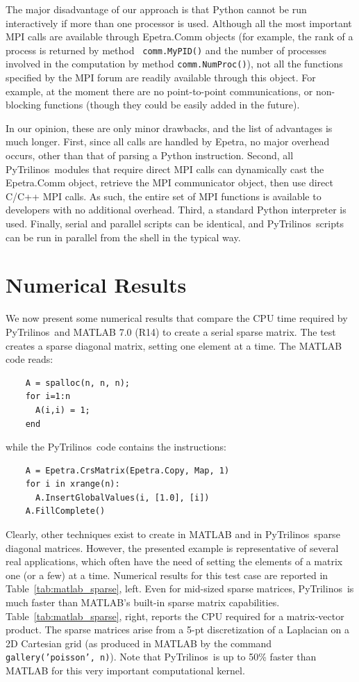 \documentclass{llncs}
\newcommand{\PyTrilinos}{{\sc PyTrilinos}}
\begin{document}
The major disadvantage of our approach is that Python cannot be run
interactively if more than one processor is used.  Although all the
most important MPI calls are available through Epetra.Comm objects
(for example, the rank of a process is returned by method {\tt
  comm.MyPID()} and the number of processes involved in the
computation by method {\tt comm.NumProc()}), not all the functions
specified by the MPI forum are readily available through this object.
For example, at the moment there are no point-to-point communications,
or non-blocking functions (though they could be easily added in the
future).

In our opinion, these are only minor drawbacks, and the list of
advantages is much longer.  First, since all calls are handled by
Epetra, no major overhead occurs, other than that of parsing a Python
instruction.  Second, all \PyTrilinos\ modules that require direct MPI
calls can dynamically cast the Epetra.Comm object, retrieve the MPI
communicator object, then use direct C/C++ MPI calls.  As such, the
entire set of MPI functions is available to developers with no
additional overhead.  Third, a standard Python interpreter is used.
Finally, serial and parallel scripts can be identical, and \PyTrilinos{}ripts can be run in parallel from the shell in the typical way.

\section{Numerical Results}
\label{sec:comparison_matlab}

We now present some numerical results that compare the CPU time
required by \PyTrilinos\ and MATLAB 7.0 (R14) to create a  serial
sparse matrix.  The test creates a sparse diagonal matrix, setting one element
at a time.  The MATLAB code reads:
\begin{verbatim}
    A = spalloc(n, n, n);
    for i=1:n
      A(i,i) = 1;
    end
\end{verbatim}
while the \PyTrilinos\ code contains the instructions:
\begin{verbatim}
    A = Epetra.CrsMatrix(Epetra.Copy, Map, 1)
    for i in xrange(n):
      A.InsertGlobalValues(i, [1.0], [i])
    A.FillComplete()
\end{verbatim}
Clearly, other techniques exist to create in MATLAB and in
\PyTrilinos\ sparse diagonal matrices.  However, the presented example
is representative of several real applications, which often have the
need of setting the elements of a matrix one (or a few) at a time.
Numerical results for this test case are reported in
Table~\ref{tab:matlab_sparse}, left.  Even for mid-sized sparse matrices,
\PyTrilinos\ is much faster than MATLAB's built-in sparse matrix
capabilities.  Table~\ref{tab:matlab_sparse}, right, reports the CPU required
for a matrix-vector product.  The sparse matrices arise from a 5-pt
discretization of a Laplacian on a 2D Cartesian grid (as produced in
MATLAB by the command {\tt gallery('poisson', n)}).  Note that
\PyTrilinos\ is up to 50\% faster than MATLAB for this very important
computational kernel.
\end{document}
